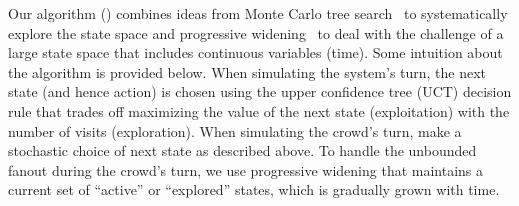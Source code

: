 %
%
%

Our algorithm () combines ideas from Monte Carlo tree search~\citep{kocsis2006bandit} to systematically explore the state space and 
progressive widening~\citep{coulom2007computing} to deal with the challenge of a large state space that includes continuous variables (time).
Some intuition about the algorithm is provided below.
When simulating the system's turn, the next state (and hence action) is chosen using the upper confidence tree (UCT) decision rule that trades off maximizing the value of the next state (exploitation) with the number of visits (exploration).
When simulating the crowd's turn, make a stochastic choice of next state as described above. 
To handle the unbounded fanout during the crowd's turn, we use progressive widening  
that maintains a current set of ``active'' or ``explored'' states, which is gradually grown with time. 

